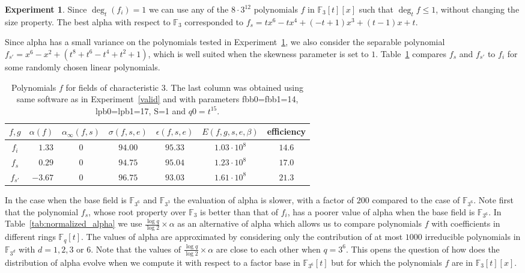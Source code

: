 \documentclass[a4wide]{article}
\newcommand{\F}{{\mathbb F}}
\theoremstyle{plain}
\theoremstyle{definition}
\newtheorem{experiment}{Experiment}
\theoremstyle{remark}
\begin{document}
\begin{experiment}\label{exp:char3}
	Since $\deg_t(f_i)=1$ we can use any of the $8\cdot 3^{12}$
	polynomials $f$ in $\F_3[t][x]$ such that $\deg_tf\leq 1$, without
        changing the size property.  The best alpha with respect to
        $\F_{3}$ corresponded to $f_s=tx^6 -  tx^4 + (-t + 1)x^3 + (t - 1)x + t$.
\end{experiment}
Since alpha has a small variance on the polynomials tested in
Experiment~\ref{exp:char3}, we also consider the separable polynomial
$f_{s'}=x^6 - x^2 + (t^8 + t^6 - t^4 + t^2 + 1)$, which is well suited when
the skewness parameter is set to $1$. Table~\ref{tab:char3} compares $f_s$
and $f_{s'}$ to $f_i$ for some randomly chosen
linear polynomials. 
\begin{table}
	\begin{center}
		\begin{tabular}{|c|rccccc|}
	\hline
	$f,g$ & $\alpha(f)$ & $\alpha_\infty(f,s)$ & $\sigma(f,s,e)$ &
	$\epsilon(f,s,e)$ & $E(f,g,s,e,\beta)$ & efficiency \\
	\hline
	$f_i$ & $1.33$ &   $0$        & $94.00$ & $95.33$  & $1.03\cdot10^8$  & $14.6$ \\ 
	$f_s$ & $0.29$ &   $0$        & $94.75$ & $95.04$  & $1.23\cdot10^8$  & $17.0$ \\
$f_{s'}$   & $-3.67$   &   $0$        & $96.75$ & $93.03$  & $1.61\cdot10^8$  & $21.3$ \\
	\hline
	\end{tabular}
	\end{center}
	\caption{Polynomials $f$ for fields of characteristic $3$. The last
	column was obtained using same software as in Experiment~\ref{valid}
and with parameters fbb0=fbb1=14, lpb0=lpb1=17, S=1 and $q0=t^{15}$.}
	\label{tab:char3}
\end{table}

In the case when the base field is $\F_{3^6}$ and $\F_{3^3}$ the evaluation of
alpha is slower, with a factor of $200$ compared to the case of $\F_{3^6}$. Note first
that the polynomial $f_s$, whose root property over $\F_3$ is better than
that of $f_i$, has a
poorer value of alpha when the base field is $\F_{3^6}$. In
Table~\ref{tab:normalized_alpha} we use $\frac{\log q}{\log 2}\times \alpha$ as an
alternative of alpha which allows us to compare polynomials $f$ with
coefficients in different rings $\F_q[t]$. The values of alpha are
approximated by considering only the contribution of at most $1000$ irreducible polynomials
in $\F_{3^d}$ with $d=1,2,3$ or $6$. Note that the values of $\frac{\log
q}{\log 2}\times \alpha$ are close to each other when $q=3^6$. This opens the question of
how does the distribution of alpha evolve when we compute it with respect to
a factor base in $\F_{3^6}[t]$ but for which the polynomials $f$ are in
$\F_3[t][x]$. 
\end{document}
